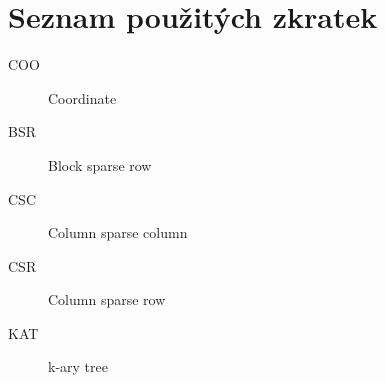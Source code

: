 \documentclass[thesis=B,czech]{FITthesis}[2012/06/26]
\begin{document}



\appendix

\chapter{Seznam použitých zkratek}
\begin{description}
	\item[COO] Coordinate
	\item[BSR] Block sparse row
	\item[CSC] Column sparse column
	\item[CSR] Column sparse row
	\item[KAT] k-ary tree
\end{description}

\nopagebreak[4]
\nopagebreak[4]

\listoffigures

\nopagebreak[4]
\nopagebreak[4]

\listofalgorithms*

\nopagebreak[4]
\nopagebreak[4]
\end{document}
